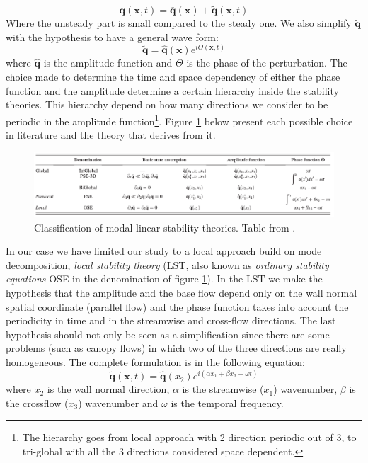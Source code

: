 $$ \mathbf{q} (\mathbf{x},t)= \overline{\mathbf{q}} (\mathbf{x}) + \widetilde{\mathbf{q}} (\mathbf{x},t) $$
Where the unsteady part is small compared to the steady one. We also simplify $\widetilde{\mathbf{q}}$ with the hypothesis to have a general wave form:
$$  \widetilde{\mathbf{q}} =  \widehat{\mathbf{q}}(\mathbf{x}) e^{i\Theta(\mathbf{x},t)} $$
where $\widehat{\mathbf{q}}$ is the amplitude function and $\Theta$ is the phase of the perturbation.
The choice made to determine the time and space dependency of either the phase function and the amplitude determine a certain hierarchy inside the stability theories. This hierarchy depend on how many directions we consider to be periodic in the amplitude function\footnote{The hierarchy goes from local approach with 2 direction periodic out of 3, to tri-global with all the 3 directions considered space dependent.}.
Figure \ref{fig:table} below present each possible choice in literature and the theory that derives from it.

\begin{figure}[h]
	\centering
	\includegraphics[width=1\linewidth]{chapter_1/table}
	\caption{Classification of modal linear stability theories. Table from \citet{juniper2014modal}.}
	\label{fig:table}
\end{figure}
 
In our case we have limited our study to a local approach build on mode decomposition, \textit{local stability theory} (LST, also known as \textit{ordinary stability equations} OSE in the denomination of figure \ref{fig:table}).
In the LST we make the hypothesis that the amplitude and the base flow depend only on the wall normal spatial coordinate (parallel flow) and the phase function takes into account the periodicity in time and in the streamwise and cross-flow directions.
The last hypothesis should not only be seen as a simplification since there are some problems (such as canopy flows) in which two of the three directions are really homogeneous.
The complete formulation is in the following equation:
 $$  \widetilde{\mathbf{q}}(\mathbf{x},t) =  \widehat{\mathbf{q}}(x_2) e^{i(\alpha x_1 + \beta x_3 - \omega t)}  $$ 
where $x_2$ is the wall normal direction, $\alpha$ is the streamwise ($x_1$) wavenumber, $\beta$ is the crossflow ($x_3$) wavenumber and $\omega$ is the temporal frequency.

